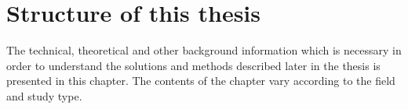 \section{Structure of this thesis}
The technical, theoretical and other background information which is necessary in order to understand the solutions and methods described later in the thesis is presented in this chapter. The contents of the chapter vary according to the field and study type.  







